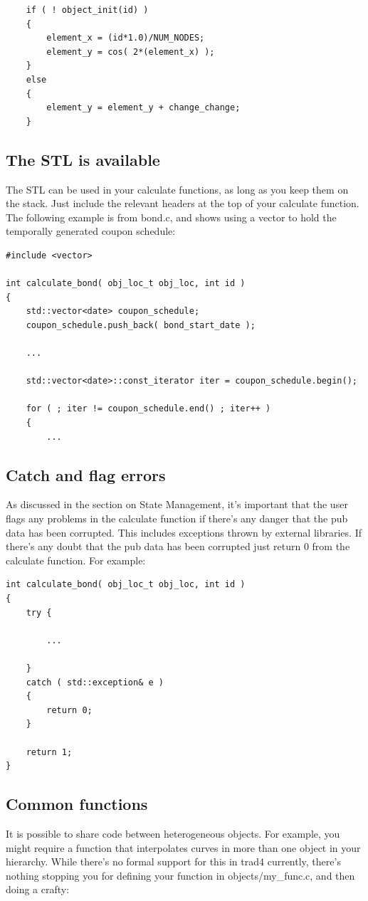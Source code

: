 \documentclass{report}
\begin{document}
\begin{verbatim}
    if ( ! object_init(id) )
    {
        element_x = (id*1.0)/NUM_NODES;
        element_y = cos( 2*(element_x) );
    }
    else
    {
        element_y = element_y + change_change;
    }
\end{verbatim}

\subsection{The STL is available}

The STL  can be used in your calculate functions, as long as you keep them on the stack. Just include the relevant headers at the top of your calculate function. The following example is from bond.c, and shows using a vector to hold the temporally generated coupon schedule:

\begin{verbatim}
#include <vector>

int calculate_bond( obj_loc_t obj_loc, int id )
{
    std::vector<date> coupon_schedule;
    coupon_schedule.push_back( bond_start_date );

    ...

    std::vector<date>::const_iterator iter = coupon_schedule.begin();

    for ( ; iter != coupon_schedule.end() ; iter++ )
    {
        ...
\end{verbatim}


\subsection{Catch and flag errors}

As discussed in the section on State Management, it's important that the user flags any problems in the calculate function if there's any danger that the pub data has been corrupted. This includes exceptions thrown by external libraries. If there's any doubt that the pub data has been corrupted just return 0 from the calculate function. For example:

\begin{verbatim}
int calculate_bond( obj_loc_t obj_loc, int id )
{
    try {

        ...

    }
    catch ( std::exception& e )
    {
        return 0;
    }

    return 1;
}
\end{verbatim}

\subsection{Common functions}
It is possible to share code between heterogeneous objects. For example, you might require a function that interpolates curves in more than one object in your hierarchy. While there's no formal support for this in trad4 currently, there's nothing stopping you for defining your function in objects/my_func.c, and then doing a crafty:
\end{document}

